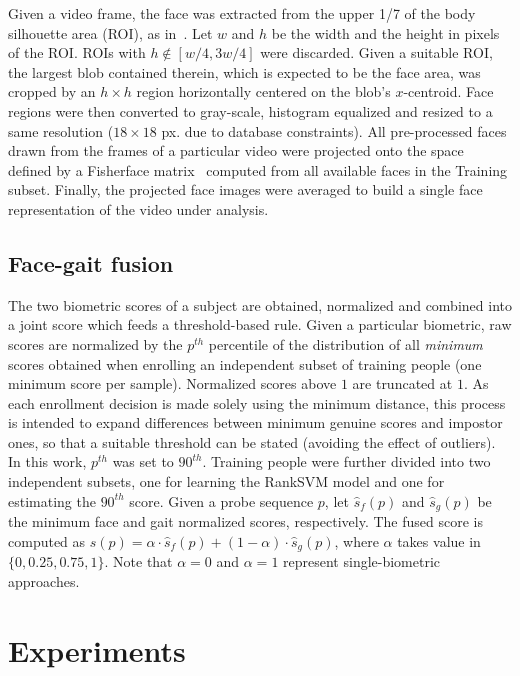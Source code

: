 \documentclass{llncs}
\begin{document}
\vspace{-1mm}
Given a video frame, the face was extracted from the upper 1/7 of the body silhouette area (ROI), as in~\cite{Geng:2010}. Let $w$ and $h$ be the width and the height in pixels of the ROI. ROIs with $h\notin[w/4,3w/4]$ were discarded. Given a suitable ROI, the largest blob contained therein, which is expected to be the face area, was cropped by an $h\times h$ region horizontally centered on the blob's $x$-centroid. Face regions were then converted to gray-scale, histogram equalized and resized to a same resolution ($18\times18$ px. due to database constraints). All pre-processed faces drawn from the frames of a particular video were projected onto the space defined by a Fisherface matrix~\cite{Belhumeur:1997} computed from all available faces in the Training subset. Finally, the projected face images were averaged to build a single face representation of the video under analysis.

\subsection{Face-gait fusion}\label{subsec:fusion}

\vspace{-1mm}

The two biometric scores of a subject are obtained, normalized and combined into a joint score which feeds a threshold-based rule. Given a particular biometric, raw scores are normalized by the $p^{th}$ percentile of the distribution of all \emph{minimum} scores obtained when enrolling an independent subset of training people (one minimum score per sample). Normalized scores above $1$ are truncated at $1$. As each enrollment decision is made solely using the minimum distance, this process is intended to expand differences between minimum genuine scores and impostor ones, so that a suitable threshold can be stated (avoiding the effect of outliers). In this work, $p^{th}$ was set to $90^{th}$. Training people were further divided into two independent subsets, one for learning the RankSVM model and one for estimating the $90^{th}$ score. Given a probe sequence $p$, let ${\hat s}_f(p)$ and ${\hat s}_g(p)$ be the minimum face and gait normalized scores, respectively. The fused score is computed as $s(p)=\alpha\cdot{\hat s}_f(p)+(1-\alpha)\cdot{\hat s}_g(p)$, where $\alpha$ takes value in $\{0,0.25,0.75,1\}$. Note that $\alpha=0$ and $\alpha=1$ represent single-biometric approaches. 

\section{Experiments}\label{sec:experiments}
\end{document}
